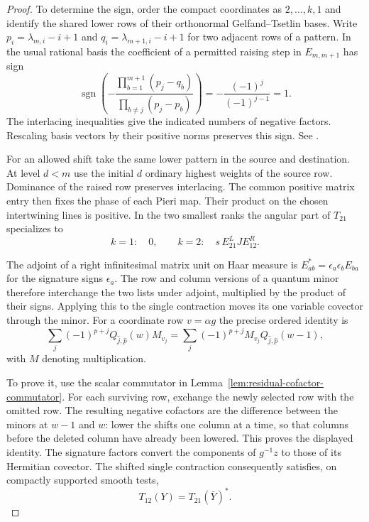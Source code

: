 \begin{proof}
To determine the sign, order the compact coordinates as
\(2,\ldots,k,1\) and identify the shared lower rows of their
orthonormal Gelfand--Tsetlin bases. Write
\(p_i=\lambda_{m,i}-i+1\) and
\(q_i=\lambda_{m+1,i}-i+1\) for two adjacent rows of a pattern.
In the usual rational basis the coefficient of a permitted raising
step in \(E_{m,m+1}\) has sign
\[
 \operatorname{sgn}\left(
 -\frac{\prod_{b=1}^{m+1}(p_j-q_b)}
             {\prod_{b\ne j}(p_j-p_b)}
 \right)=-\frac{(-1)^j}{(-1)^{j-1}}=1 .
\]
The interlacing inequalities give the indicated numbers of negative
factors. Rescaling basis vectors by their positive norms preserves
this sign. See \cite[Theorem~2.3, (2.6)--(2.8)]{molev-branching}.

For an allowed shift take the same lower pattern in the source
and destination. At level \(d<m\) use the initial \(d\) ordinary
highest weights of the source row. Dominance of the raised row
preserves interlacing. The common positive matrix entry then fixes
the phase of each Pieri map. Their product on the chosen
intertwining lines is positive. In the two smallest ranks the
angular part of \(T_{21}\) specializes to
\[
 k=1:\quad 0, \qquad
 k=2:\quad s\,E^L_{21}J E^R_{12}.
\]

The adjoint of a right infinitesimal matrix unit on Haar measure
is \(E_{ab}^*=\epsilon_a\epsilon_b E_{ba}\) for the signature
signs \(\epsilon_a\). The row and column versions of a quantum minor
therefore interchange the two lists under adjoint, multiplied by
the product of their signs. Applying this to the single contraction
moves its one variable covector through the minor. For a coordinate
row \(v=\alpha g\) the precise ordered identity is
\[
 \sum_j(-1)^{p+j} Q_{\widehat j,\widehat p}(w)M_{v_j}
     =\sum_j(-1)^{p+j} M_{v_j} Q_{\widehat j,\widehat p}(w-1),
\]
with \(M\) denoting multiplication.

To prove it, use the scalar
commutator in Lemma~\ref{lem:residual-cofactor-commutator}.
For each surviving row, exchange the newly selected row with the
omitted row. The resulting negative cofactors are the difference
between the minors at \(w-1\) and \(w\): lower the shifts one column
at a time, so that columns before the deleted column have already
been lowered. This proves the displayed identity. The signature
factors convert the components of \(g^{-1}z\) to those of its
Hermitian covector. The shifted single contraction consequently
satisfies, on compactly supported smooth tests,
\[
                   T_{12}(Y)=T_{21}(\bar Y)^* .
\]


\end{proof}
